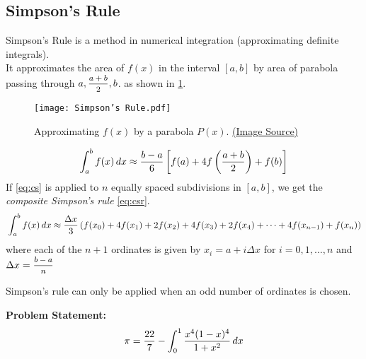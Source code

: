 \subsection{Simpson's Rule}{\label{pp:simpsonsrule}}
{\small%
Simpson's Rule is a method in numerical integration (approximating definite integrals).\\
It approximates the area of $f(x)$ in the interval $[a,b]$ by area of parabola passing through $a, \mfrac{a+b}{2}, b$. as shown in \ref{fig:simpsonsrule}.%
\begin{figure}[H]
\centering
\texttt{[image: Simpson's Rule.pdf]}
\caption{Approximating $f(x)$ by a parabola $P(x)$. \href{https://bit.ly/simpsons-rule}{(Image Source)}}
\label{fig:simpsonsrule}
\end{figure}
\begin{equation}{\label{eq:cs}}
{ \int _{a}^{b}f(x)\,dx\approx {\frac {b-a}{6}}\left[f(a)+4f\left({\frac {a+b}{2}}\right)+f(b)\right]}
\end{equation}
If \ref{eq:cs} is applied to $n$ equally spaced subdivisions in $[a, b]$, we get the \emph{composite Simpson's rule} \ref{eq:csr}.
\begin{equation}{\label{eq:csr}}
	 \int _{a}^{b}f(x)\,dx\approx {\frac {\Delta x}{3}}\left(f(x_{0})+4f(x_{1})+2f(x_{2})+4f(x_{3})+2f(x_{4})+\cdots +4f(x_{n-1})+f(x_{n})\right)
\end{equation}
where each of the $n+1$ ordinates is given by $x_i = a+i\Delta x$ for $i = 0,1,\ldots,n$ and $\Delta x = \mfrac{b-a}{n}$
\begin{note}
	Simpson's rule can only be applied when an odd number of ordinates is chosen.
\end{note}
\textbf{Problem Statement:}\\
\begin{equation}{\label{eq:pi_integral}}
{ \pi={22 \over 7} - \int _{0}^{1}{x^{4}(1-x)^{4} \over 1+x^{2}}\,dx } 
\end{equation}
}
